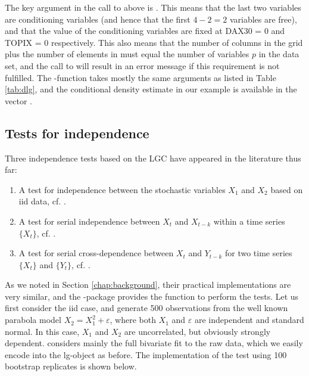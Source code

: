 The key argument in the call to  above is . This means that the last two variables are conditioning variables (and hence that the first \(4-2=2\) variables are free), and that the value of the conditioning variables are fixed at DAX30 = 0 and TOPIX = 0 respectively. This also means that the number of columns in the grid  plus the number of elements in  must equal the number of variables \(p\) in the data set, and the call to  will result in an error message if this requirement is not fulfilled. The -function takes mostly the same arguments as  listed in Table \ref{tab:dlg}, and the conditional density estimate in our example is available in the vector .

\subsection{Tests for independence}
\label{chap:indtests}

Three independence tests based on the LGC have appeared in the literature thus far:

\begin{enumerate}
\def\labelenumi{\arabic{enumi}.}
\item
  A test for independence between the stochastic variables \(X_1\) and \(X_2\) based on iid data, cf. \citet{bere:tjos:2014}.
\item
  A test for serial independence between \(X_t\) and \(X_{t-k}\) within a time series \(\{X_t\}\), cf. \citet{laca:tjos:2017}. 
\item
  A test for serial cross-dependence between \(X_t\) and \(Y_{t-k}\) for two time series \(\{X_t\}\) and \(\{Y_t\}\), cf. \citet{laca:tjos:2018}.
\end{enumerate}
As we noted in Section \ref{chap:background}, their practical implementations are very similar, and the -package provides the function  to perform the tests. Let us first consider the iid case, and generate 500 observations  from the well known parabola model \(X_2 = X_1^2 + \varepsilon\), where both \(X_1\) and \(\varepsilon\) are independent and standard normal. In this case, \(X_1\) and \(X_2\) are uncorrelated, but obviously strongly dependent. \citet{bere:tjos:2014} considers mainly the full bivariate fit to the raw data, which we easily encode into the lg-object as before. The implementation of the test using 100 bootstrap replicates is shown below.


